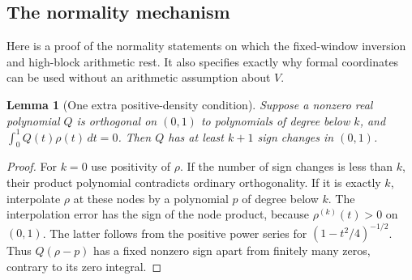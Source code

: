 \documentclass[11pt,a4paper]{article}
\numberwithin{equation}{section}
\newtheorem{lemma}[theorem]{Lemma}
\theoremstyle{definition}\newtheorem{definition}[theorem]{Definition}
\theoremstyle{remark}\newtheorem{remark}[theorem]{Remark}
\begin{document}
\subsection{The normality mechanism}
\label{height:keio:normalityproof}
Here is a proof of the normality statements on which the fixed-window
inversion and high-block arithmetic rest. It also specifies exactly why
formal coordinates can be used without an arithmetic assumption about $V$.

\begin{lemma}[One extra positive-density condition]
\label{height:keio:signchange}
Suppose a nonzero real polynomial $Q$ is orthogonal on $(0,1)$ to
polynomials of degree below $k$, and $\int_0^1Q(t)\rho(t)\,dt=0$.
Then $Q$ has at least $k+1$ sign changes in $(0,1)$.
\end{lemma}
\begin{proof}
For $k=0$ use positivity of $\rho$. If the number of sign changes is
less than $k$, their product polynomial contradicts ordinary
orthogonality. If it is exactly $k$, interpolate $\rho$ at these nodes
by a polynomial $p$ of degree below $k$. The interpolation error has
the sign of the node product, because $\rho^{(k)}(t)>0$ on $(0,1)$.
The latter follows from the positive power series for
$(1-t^2/4)^{-1/2}$. Thus $Q(\rho-p)$ has a fixed nonzero sign apart
from finitely many zeros, contrary to its zero integral.
\end{proof}
\end{document}
